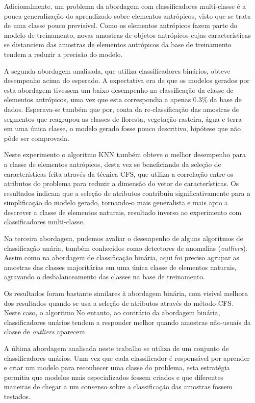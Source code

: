 Adicionalmente, um problema da abordagem com classificadores multi-classe é a pouca generalização do aprendizado sobre elementos antrópicos, visto que se trata de uma classe pouco previsível. Como os elementos antrópicos fazem parte do modelo de treinamento, novas amostras de objetos antrópicos cujas características se distanciem das amostras de elementos antrópicos da base de treinamento tendem a reduzir a precisão do modelo.

A segunda abordagem analisada, que utiliza classificadores binários, obteve desempenho acima do esperado. A expectativa era de que os modelos gerados por esta abordagem tivessem um baixo desempenho na classificação da classe de elementos antrópicos, uma vez que esta correspondia a apenas 0.3\% da base de dados. Esperava-se também que por, conta da re-classificação das amostras de segmentos que reagrupou as classes de floresta, vegetação rasteira, água e terra em uma única classe, o modelo gerado fosse pouco descritivo, hipótese que não pôde ser comprovada.

Neste experimento o algoritmo KNN também obteve o melhor desempenho para a classe de elementos antrópicos, desta vez se beneficiando da seleção de características feita através da técnica CFS, que utiliza a correlação entre os atributos do problema para reduzir a dimensão do vetor de características. Os resultados indicam que a seleção de atributos contribuiu significativamente para a simplificação do modelo gerado, tornando-o mais generalista e mais apto a descrever a classe de elementos naturais, resultado inverso ao experimento com classificadores multi-classe.

Na terceira abordagem, pudemos avaliar o desempenho de alguns algoritmos de classificação unária, também conhecidos como detectores de anomalias (\textit{outliers}). Assim como na abordagem de classificação binária, aqui foi preciso agrupar as amostras das classes majoritárias em uma única classe de elementos naturais, agravando o desbalanceamento das classes na base de treinamento.

Os resultados foram bastante similares à abordagem binária, com visível melhora dos resultados quando se usa a seleção de atributos através do método CFS. Neste caso, o algoritmo No entanto, ao contrário da abordagem binária, classificadores unários tendem a responder melhor quando amostras não-usuais da classe de \textit{outliers} aparecem.

A última abordagem analisada neste trabalho se utiliza de um conjunto de classificadores unários. Uma vez que cada classificador é responsável por aprender e criar um modelo para reconhecer uma classe do problema, esta estratégia permitiu que modelos mais especializados fossem criados e que diferentes maneiras de chegar a um consenso sobre a classificação das amostras fossem testados.

